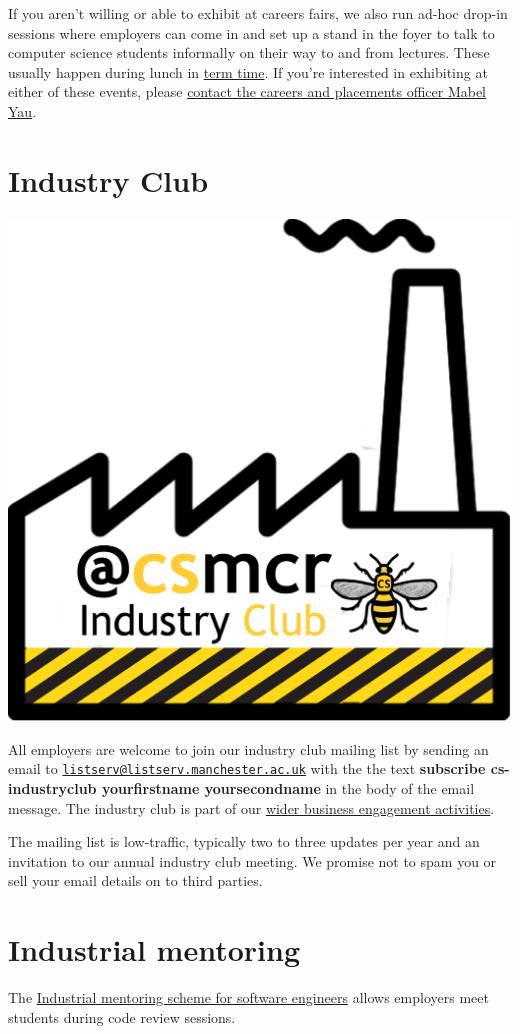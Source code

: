\documentclass[
  12pt,
]{book}
\begin{document}
If you aren't willing or able to exhibit at careers fairs, we also run ad-hoc drop-in sessions where employers can come in and set up a stand in the foyer to talk to computer science students informally on their way to and from lectures. These usually happen during lunch in \href{https://www.manchester.ac.uk/discover/key-dates/}{term time}. If you're interested in exhibiting at either of these events, please \protect\hyperlink{Contact}{contact the careers and placements officer Mabel Yau}.

\hypertarget{industryclub}{%
\section{Industry Club}\label{industryclub}}

\begin{center}\includegraphics[width=0.4\linewidth]{images/industry-club-black} \end{center}

All employers are welcome to join our industry club mailing list by sending an email to \href{mailto:listserv@listserv.manchester.ac.uk}{\nolinkurl{listserv@listserv.manchester.ac.uk}} with the the text \textbf{subscribe cs-industryclub yourfirstname yoursecondname} in the body of the email message. The industry club is part of our \href{https://www.cs.manchester.ac.uk/connect/business-engagement/}{wider business engagement activities}.

The mailing list is low-traffic, typically two to three updates per year and an invitation to our annual industry club meeting. We promise not to spam you or sell your email details on to third parties.

\hypertarget{mentoring}{%
\section{Industrial mentoring}\label{mentoring}}

The \href{https://www.cs.manchester.ac.uk/connect/business-engagement/industrial-mentoring/}{Industrial mentoring scheme for software engineers} allows employers meet students during code review sessions.
\end{document}
